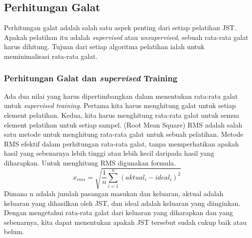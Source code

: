 \subsection{Perhitungan Galat}
Perhitungan galat adalah salah satu aspek penting dari setiap pelatihan JST. Apakah pelatihan itu adalah\textit{ supervised }atau \textit{unsupervised}, sebuah rata-rata galat harus dihitung. Tujuan dari setiap algoritma pelatihan ialah untuk meminimalisasi rata-rata galat.
\subsubsection{Perhitungan Galat dan\textit{ supervised }Training}
Ada dua nilai yang harus dipertimbangkan dalam menentukan rata-rata galat untuk\textit{ supervised training}. Pertama kita harus menghitung galat untuk setiap element pelatihan. Kedua, kita harus menghitung rata-rata galat untuk semua element pelatihan untuk setiap sampel. (Root Mean Square) RMS adalah salah satu metode untuk menghitung rata-rata galat untuk sebuah pelatihan. Metode RMS efektif dalam perhitungan rata-rata galat, tanpa memperhatikan apakah hasil yang sebenarnya lebih tinggi atau lebih kecil daripada hasil yang diharapkan. Untuk menghitung RMS digunakan formula. 
\begin{displaymath}
	x_{rms}= \sqrt{\frac{1}{n}\sum_{i=1}^{n}(aktual_{i}-ideal_{i})^2}	
\end{displaymath}
Dimana n adalah jumlah pasangan masukan dan keluaran, aktual adalah keluaran yang dihasilkan oleh JST, dan ideal adalah keluaran yang diinginkan. Dengan mengetahui rata-rata galat dari keluaran yang diharapkan dan yang sebenarnya, kita dapat menentukan apakah JST tersebut sudah cukup baik atau belum.
